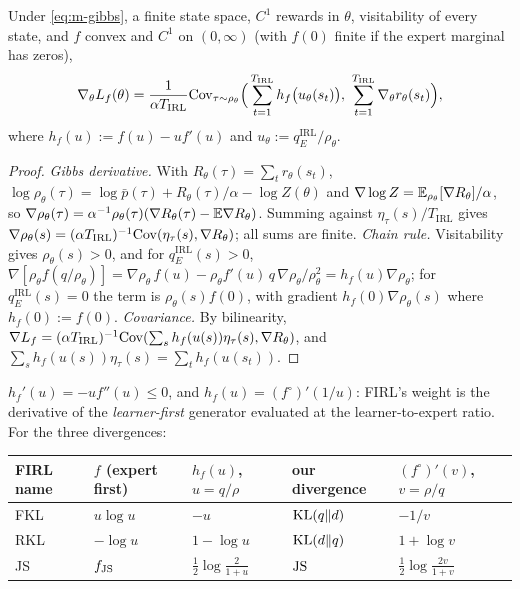 \begin{theorem}\label{thm:m-firl}
Under \eqref{eq:m-gibbs}, a finite state space, $C^1$ rewards in $\theta$, visitability of every state, and $f$ convex and $C^1$ on $(0,\infty)$ (with $f(0)$ finite if the expert marginal has zeros),
\[
\nabla_\theta L_f(\theta)=\frac1{\alpha T_{\mathrm{IRL}}}\Cov_{\tau\sim\rho_\theta}\Big(\sum_{t=1}^{T_{\mathrm{IRL}}}h_f\big(u_\theta(s_t)\big),\ \sum_{t=1}^{T_{\mathrm{IRL}}}\nabla_\theta r_\theta(s_t)\Big),
\]
where $h_f(u):=f(u)-uf'(u)$ and $u_\theta:=q^{\mathrm{IRL}}_E/\rho_\theta$.
\end{theorem}
\begin{proof}
\emph{Gibbs derivative.} With $R_\theta(\tau)=\sum_tr_\theta(s_t)$, $\log\rho_\theta(\tau)=\log\bar p(\tau)+R_\theta(\tau)/\alpha-\log Z(\theta)$ and $\nabla\log Z=\mathbb{E}_{\rho_\theta}[\nabla R_\theta]/\alpha$, so $\nabla\rho_\theta(\tau)=\alpha^{-1}\rho_\theta(\tau)(\nabla R_\theta(\tau)-\mathbb{E}\nabla R_\theta)$. Summing against $\eta_\tau(s)/T_{\mathrm{IRL}}$ gives $\nabla\rho_\theta(s)=(\alpha T_{\mathrm{IRL}})^{-1}\mathrm{Cov}(\eta_\tau(s),\nabla R_\theta)$; all sums are finite.
\emph{Chain rule.} Visitability gives $\rho_\theta(s)>0$, and for $q^{\mathrm{IRL}}_E(s)>0$,
$\nabla[\rho_\theta f(q/\rho_\theta)]=\nabla\rho_\theta\,f(u)-\rho_\theta f'(u)\,q\,\nabla\rho_\theta/\rho_\theta^2=h_f(u)\nabla\rho_\theta$; for $q^{\mathrm{IRL}}_E(s)=0$ the term is $\rho_\theta(s)f(0)$, with gradient $h_f(0)\nabla\rho_\theta(s)$ where $h_f(0):=f(0)$.
\emph{Covariance.} By bilinearity, $\nabla L_f=(\alpha T_{\mathrm{IRL}})^{-1}\mathrm{Cov}(\sum_sh_f(u(s))\eta_\tau(s),\nabla R_\theta)$, and $\sum_sh_f(u(s))\eta_\tau(s)=\sum_th_f(u(s_t))$.
\end{proof}

\begin{proposition}\label{prop:m-firl-h}
$h_f'(u)=-uf''(u)\le0$, and $h_f(u)=(f^\circ)'(1/u)$: FIRL's weight is the derivative of the \emph{learner-first} generator evaluated at the learner-to-expert ratio. For the three divergences:
\begin{center}
\small
\begin{tabular}{@{}lllll@{}}
\toprule
FIRL name & $f$ (expert first) & $h_f(u)$, $u=q/\rho$ & our divergence & $(f^\circ)'(v)$, $v=\rho/q$\\
\midrule
FKL & $u\log u$ & $-u$ & $\mathrm{KL}(q\Vert d)$ & $-1/v$\\
RKL & $-\log u$ & $1-\log u$ & $\mathrm{KL}(d\Vert q)$ & $1+\log v$\\
JS & $f_{\mathrm{JS}}$ & $\tfrac12\log\tfrac2{1+u}$ & $\mathrm{JS}$ & $\tfrac12\log\tfrac{2v}{1+v}$\\
\bottomrule
\end{tabular}
\end{center}
\end{proposition}

